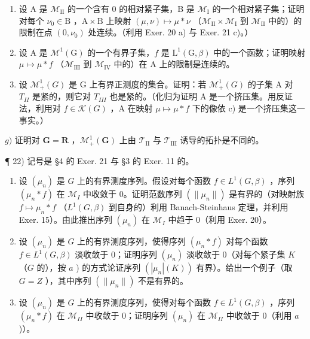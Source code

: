\begin{enumerate}
\item
  设 A 是 \(\mathcal{M}_{\mathrm{II}}\) 的一个含有 0 的相对紧子集，B 是 \(\mathcal{M}_{\mathrm{I}}\) 的一个相对紧子集；证明对每个 \(\nu_0 \in \mathrm{B}\) ，\(\mathrm{A} \times \mathrm{B}\) 上映射 \((\mu, \nu) \mapsto \mu * \nu\) （\(\mathcal{M}_{\mathrm{II}} \times \mathcal{M}_{\mathrm{I}}\) 到 \(\mathcal{M}_{\mathrm{II}}\) 中的）的限制在点 \((0, \nu_0)\) 处连续。（利用 Exer. 20 a) 与 Exer. 21 c)。）
\item
  设 A 是 \(\mathcal{M}^1 (\mathrm{G})\) 的一个有界子集，\(f\) 是 \(\mathrm{L}^1 (\mathrm{G},\beta)\) 中的一个函数；证明映射 \(\mu \mapsto \mu *f\) （\(\mathcal{M}_{\mathrm{III}}\) 到 \(\mathcal{M}_{\mathrm{IV}}\) 中的）在 A 上的限制是连续的。
\item
  设 \(\mathcal{M}_{+}^{1}(G)\) 是 G 上有界正测度的集合。证明：若 \(\mathcal{M}_{+}^{1}(G)\) 的子集 A 对 \(T_{II}\) 是紧的，则它对 \(T_{III}\) 也是紧的。（化归为证明 A 是一个挤压集。用反证法，利用对 \(f \in \mathcal{K}(G)\) ，A 在映射 \(\mu \mapsto \mu * f\) 下的像依 c) 是一个挤压集这一事实。）
\end{enumerate}

\(g)\) 证明对 \(\mathbf{G} = \mathbf{R}\) ，\(\mathcal{M}_{+}^{1}(\mathbf{G})\) 上由 \(\mathcal{T}_{\mathrm{II}}\) 与 \(\mathcal{T}_{\mathrm{III}}\) 诱导的拓扑是不同的。

¶ 22) 记号是 §4 的 Exer. 21 与 §3 的 Exer. 11 的。

\begin{enumerate}
\def\labelenumi{\alph{enumi})}
\item
  设 \((\mu_n)\) 是 \(G\) 上的有界测度序列。假设对每个函数 \(f \in L^1(G, \beta)\) ，序列 \((\mu_n * f)\) 在 \(\mathcal{M}_I\) 中收敛于 0。证明范数序列 \((\|\mu_n\|)\) 是有界的（对映射族 \(f \mapsto \mu_n * f\) （\(L^1(G, \beta)\) 到自身的）利用 Banach-Steinhaus 定理，并利用 Exer. 15）。由此推出序列 \((\mu_n)\) 在 \(\mathcal{M}_I\) 中趋于 0（利用 Exer. 20）。
\item
  设 \((\mu_n)\) 是 \(G\) 上的有界测度序列，使得序列 \((\mu_n * f)\) 对每个函数 \(f \in L^1(G, \beta)\) 淡收敛于 0；证明序列 \((\mu_n)\) 淡收敛于 0（对每个紧子集 \(K\) （\(G\) 的），按 \(a\) ) 的方式论证序列 \((|\mu_n|(K))\) 有界）。给出一个例子（取 \(G = Z\) ），其中序列 \((\|\mu_n\|)\) 不是有界的。
\item
  设 \((\mu_n)\) 是 \(G\) 上的有界测度序列，使得对每个函数 \(f \in L^1(G, \beta)\) ，序列 \((\mu_n * f)\) 在 \(\mathcal{M}_{II}\) 中收敛于 0；证明序列 \((\mu_n)\) 在 \(\mathcal{M}_{II}\) 中收敛于 0（利用 \(a\) )）。
\end{enumerate}

